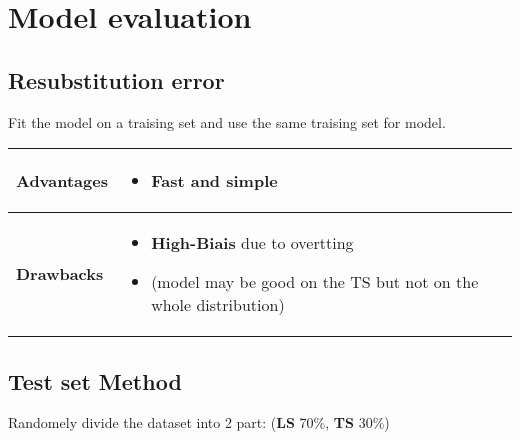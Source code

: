 \section{Model evaluation}
\subsection{Resubstitution error}
Fit the model on a traising set and use the same traising set for model.


  \begin{table}[!h]
    \begin{center}
    \begin{tabular}{| m{8em}| m{15em}|}
    \hline
    \rowcolor{vert.g} \textbf{Advantages}     &  \begin{itemize}
                                                        \item \textbf{Fast} and \textbf{simple}  
                                                 \end{itemize}\\ \hline 
    \rowcolor{red.g} \textbf{Drawbacks}       &  \begin{itemize}
                                                        \item \textbf{High-Biais} due to overtting 
                                                        \item (model may be good on the TS but not on the whole distribution)
                                                 \end{itemize}\\ \hline
    \end{tabular}
    \end{center}
    \end{table}
    
\subsection{Test set Method}
Randomely divide the dataset into 2 part: (\textbf{LS} 70\%, \textbf{TS} 30\%)

